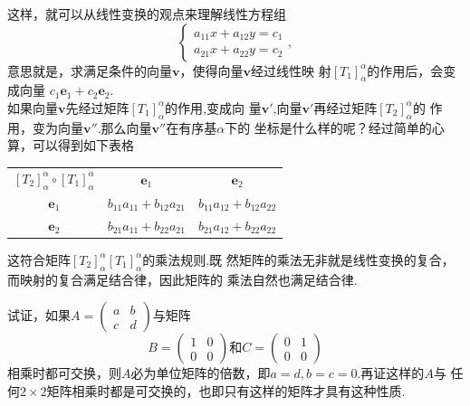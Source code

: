 ﻿\documentclass{book} \usepackage{exsheets} \usepackage{xeCJK}
\begin{document}
\begin{solution}
这样，就可以从线性变换的观点来理解线性方程组
$$
\begin{cases}
  a_{11}x+a_{12}y=c_1\\
  a_{21}x+a_{22}y=c_2
\end{cases},
$$
意思就是，求满足条件的向量$\mathbf{v}$，使得向量$\mathbf{v}$经过线性映
射$[T_1]_{\alpha}^{\alpha}$的作用后，会变成向量
$c_1\mathbf{e}_1+c_2\mathbf{e}_2$.\\

如果向量$\mathbf{v}$先经过矩阵$[T_1]_{\alpha}^{\alpha}$的作用,变成向
量$\mathbf{v}'$,向量$\mathbf{v}'$再经过矩阵$[T_2]_{\alpha}^{\alpha}$的
作用，变为向量$\mathbf{v}''$.那么向量$\mathbf{v}''$在有序基$\alpha$下的
坐标是什么样的呢？经过简单的心算，可以得到如下表格
\begin{center}
  \begin{tabular}{|c|c|c|}
    $[T_{2}]_{\alpha}^{\alpha}\circ[T_1]_{\alpha}^{\alpha}$ & $\mathbf{e}_1$& $\mathbf{e}_{2}$\\
    $\mathbf{e}_1$ & $b_{11}a_{11}+b_{12}a_{21}$ & $b_{11}a_{12}+b_{12}a_{22}$ \\
    $\mathbf{e}_2$ & $b_{21}a_{11}+b_{22}a_{21}$ & $b_{21}a_{12}+b_{22}a_{22}$ \\
  \end{tabular}
\end{center}
这符合矩阵$[T_{2}]_{\alpha}^{\alpha}[T_1]_{\alpha}^{\alpha}$的乘法规则.既
然矩阵的乘法无非就是线性变换的复合，而映射的复合满足结合律，因此矩阵的
乘法自然也满足结合律.
\end{solution}
\begin{question}
  试证，如果$A=
  \begin{pmatrix}
    a&b\\
    c&d
  \end{pmatrix}
  $与矩阵
$$
B=
\begin{pmatrix}
  1&0\\
  0&0
\end{pmatrix}
\mbox{和}C=
\begin{pmatrix}
  0&1\\
  0&0
\end{pmatrix}
$$
相乘时都可交换，则$A$必为单位矩阵的倍数，即$a=d,b=c=0$.再证这样的$A$与
任何$2\times 2$矩阵相乘时都是可交换的，也即只有这样的矩阵才具有这种性质.
\end{question}
\end{document}

